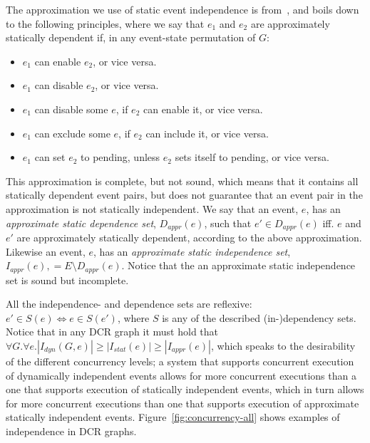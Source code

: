\documentclass{article}
\begin{document}
			The approximation we use of static event independence is from~\cite{debois_concurrency_2015}, and boils down to the following principles, where we say that $e_1$ and $e_2$ are approximately statically dependent if, in any event-state permutation of $G$:
			\begin{itemize}
				\item $e_1$ can enable $e_2$, or vice versa.
				\item $e_1$ can disable $e_2$, or vice versa.
				\item $e_1$ can disable some $e$, if $e_2$ can enable it, or vice versa.
				\item $e_1$ can exclude some $e$, if $e_2$ can include it, or vice versa.
				\item $e_1$ can set $e_2$ to pending, unless $e_2$ sets itself to pending, or vice versa.
			\end{itemize}
			This approximation is complete, but not sound, which means that it contains all statically dependent event pairs, but does not guarantee that an event pair in the approximation is not statically independent.
			We say that an event, $e$, has an \textit{approximate static dependence set}, $D_{appr}(e)$, such that $e' \in D_{appr}(e)$ iff. $e$ and $e'$ are approximately statically dependent, according to the above approximation.
			Likewise an event, $e$, has an \textit{approximate static independence set}, $I_{appr}(e),  = E \setminus D_{appr}(e)$.
			Notice that the an approximate static independence set is sound but incomplete.

			All the independence- and dependence sets are reflexive: $e' \in S(e) \iff e \in S(e')$, where $S$ is any of the described (in-)dependency sets.
			Notice that in any DCR graph it must hold that $\forall G. \forall e. |I_{dyn}(G,e)| \geq |I_{stat}(e)| \geq |I_{appr}(e)|$, which speaks to the desirability of the different concurrency levels; a system that supports concurrent execution of dynamically independent events allows for more concurrent executions than a one that supports execution of statically independent events, which in turn allows for more concurrent executions than one that supports execution of approximate statically independent events.
			Figure~\ref{fig:concurrency-all} shows examples of independence in DCR graphs.
\end{document}
